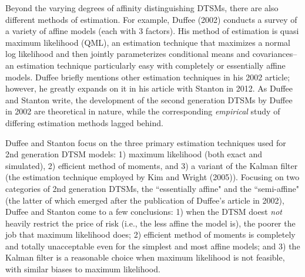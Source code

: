 \documentclass[12pt,final]{article}
\begin{document}
Beyond the varying degrees of affinity distinguishing DTSMs, there are also different methods of estimation. For example, Duffee (2002) conducts a survey of a variety of affine models (each with 3 factors). His method of estimation is quasi maximum likelihood (QML), an estimation technique that maximizes a normal log likelihood and then jointly parameterizes conditional means and covariances--an estimation technique particularly easy with completely or essentially affine models. \citep{Bollerslev1992} Duffee briefly mentions other estimation techniques in his 2002 article; however, he greatly expands on it in his article with Stanton in 2012. \citep{Duffee2012} As Duffee and Stanton write, the development of the second generation DTSMs by Duffee in 2002 are theoretical in nature, while the corresponding \textit{empirical} study of differing estimation methods lagged behind.

Duffee and Stanton focus on the three primary estimation techniques used for 2nd generation DTSM models: 1) maximum likelihood (both exact and simulated), 2) efficient method of moments, and 3) a variant of the Kalman filter (the estimation technique employed by Kim and Wright (2005)). \citep{Duffee2012} \citep{Kim2005} Focusing on two categories of 2nd generation DTSMs, the ``essentially affine" and the ``semi-affine" (the latter of which emerged after the publication of Duffee's article in 2002), Duffee and Stanton come to a few conclusions: 1) when the DTSM doest \textit{not} heavily restrict the price of risk (i.e., the less affine the model is), the poorer the job that maximum likelihood does; 2) efficient method of moments is completely and totally unacceptable even for the simplest and most affine models; and 3) the Kalman filter is a reasonable choice when maximum likelihood is not feasible, with similar biases to maximum likelihood. 
\end{document}
